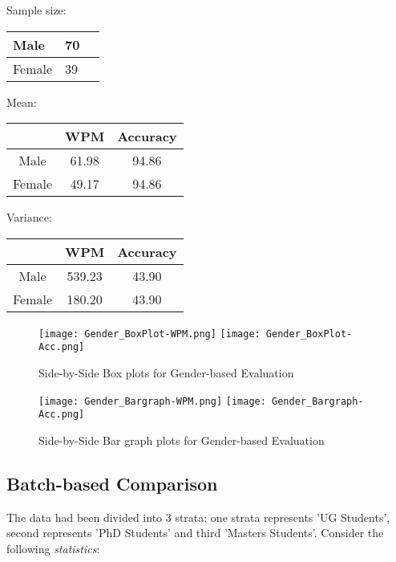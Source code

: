 \documentclass[12pt,a4paper]{report}
\begin{document}
\vspace{2mm}
\begin{center}
Sample size:
\begin{tabular}{ | m{4em} | m{1cm}| m{1cm} | }
  \hline
  Male & 70 \\ 
  \hline
  Female & 39 \\
  \hline
\end{tabular}
\end{center}
\vspace{1.5mm}

\begin{center}
Mean:
\begin{tabular}{ |c|c|c|}
  \hline
   & WPM & Accuracy \\
  \hline
  Male & 61.98 & 94.86 \\ 
  \hline
  Female &  49.17 & 94.86 \\
  \hline
\end{tabular}
\end{center}
\vspace{1.5mm}

\begin{center}
Variance:
\begin{tabular}{ |c|c|c|}
  \hline
   & WPM & Accuracy \\
  \hline
  Male & 539.23 & 43.90 \\ 
  \hline
  Female & 180.20 & 43.90 \\
  \hline
\end{tabular}
\end{center}


\begin{figure}[h]
    \centering
    \texttt{[image: Gender\_BoxPlot-WPM.png]}
    \texttt{[image: Gender\_BoxPlot-Acc.png]}
    \caption{Side-by-Side Box plots for Gender-based Evaluation}
\end{figure}
\begin{figure}[h]
    \centering
    \texttt{[image: Gender\_Bargraph-WPM.png]}
    \texttt{[image: Gender\_Bargraph-Acc.png]}
    \caption{Side-by-Side Bar graph plots for Gender-based Evaluation}
\end{figure}
\newpage
\subsection*{Batch-based Comparison}
The data had been divided into 3 strata; one strata represents 'UG Students', second represents 'PhD Students' and third 'Masters Students'. Consider the following \emph{statistics}:
\end{document}
